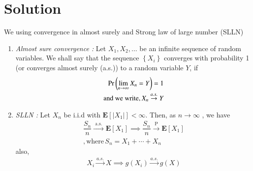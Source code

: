 \documentclass[journal,12pt,twocolumn]{IEEEtran}
\begin{document}
\section{Solution}
We using convergence in almost surely and Strong law of large number (SLLN)
\begin{enumerate}
\item {\em Almost sure convergence : }Let $X_{1}, X_{2}, \ldots$ be an infinite sequence of random variables. We shall say that the sequence $\left\{X_{i}\right\}$ converges with probability 1 (or converges almost surely (a.s.)) to a random variable $Y$, if 
\begin{align}
\Pr\left(\lim _{n \rightarrow \infty} X_{n}=Y\right)=1 \\ 
\text{and we write}, X_{n} \stackrel{a . s .}{\rightarrow} Y
\end{align} 
\item {\em SLLN : }Let $X_{n}$ be i.i.d with $\mathbf{E}\left[\left|X_{1}\right|\right]<\infty$. Then, as $n \rightarrow \infty$ , we have
\begin{align}
\dfrac{S_{n}}{n} \stackrel{\text { a.s. }}{\rightarrow} \mathbf{E}\left[X_{1}\right]\implies \dfrac{S_{n}}{n} \stackrel{\text { P }}{\rightarrow} \mathbf{E}\left[X_{1}\right]\\
,\text{where} \, S_n = X_1 + \cdots + X_n
\end{align}   
also,
\begin{align}
X_i \stackrel{a.s.}{\rightarrow} X \implies g(X_i) \stackrel{a.s.}{\rightarrow} g(X)
\label{Eq}  
\end{align}
\end{enumerate}
\end{document}
